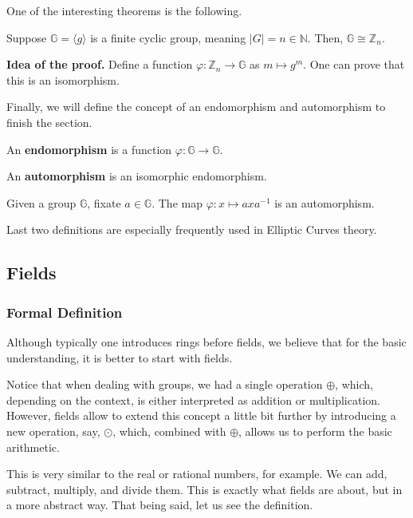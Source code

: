 \documentclass[../lecture-notes.tex]{subfiles}
\begin{document}
One of the interesting theorems is the following.

\begin{theorem}
    Suppose $\mathbb{G} = \langle g \rangle$ is a finite cyclic group, meaning $|G| = n \in \mathbb{N}$. Then, $\mathbb{G} \cong \mathbb{Z}_n$.
\end{theorem}

\textbf{Idea of the proof.} Define a function $\varphi: \mathbb{Z}_n \to \mathbb{G}$ as $m \mapsto g^m$. One can prove that this is an isomorphism.

Finally, we will define the concept of an endomorphism and automorphism to finish the section.

\begin{definition}
    An \textbf{endomorphism} is a function $\varphi: \mathbb{G} \to \mathbb{G}$.
\end{definition}

\begin{definition}
    An \textbf{automorphism} is an isomorphic endomorphism.
\end{definition}

\begin{example}
    Given a group $\mathbb{G}$, fixate $a \in \mathbb{G}$. The map $\varphi: x \mapsto axa^{-1}$ is an automorphism.
\end{example}

Last two definitions are especially frequently used in Elliptic Curves theory.

\subsection{Fields}

\subsubsection{Formal Definition}
Although typically one introduces rings before fields, we believe that for the basic understanding, it is better to start with fields. 

Notice that when dealing with groups, we had a single operation $\oplus$, which, depending on the context, is either interpreted as addition or multiplication. 
However, fields allow to extend this concept a little bit further by introducing a new operation, say, $\odot$, which, combined with $\oplus$, allows us to perform the basic arithmetic.

This is very similar to the real or rational numbers, for example. We can add, subtract, multiply, and divide them. This is exactly what fields are about, but in a more abstract way. That being said, let us see the definition.
\end{document}
